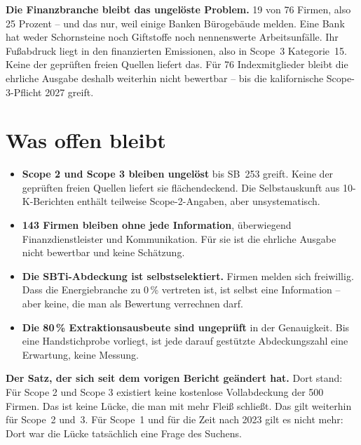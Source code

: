\documentclass[11pt,a4paper]{article}
\newcommand{\befund}[1]{%
  \par\vspace{2pt}\noindent\colorbox{softgrey}{%
  \begin{minipage}{\dimexpr\linewidth-2\fboxsep}\small\vspace{3pt}#1\vspace{3pt}\end{minipage}}\par\vspace{4pt}}
\begin{document}
\befund{\textbf{Die Finanzbranche bleibt das ungelöste Problem.} 19 von 76 Firmen, also 25 Prozent -- und das nur, weil einige Banken Bürogebäude melden. Eine Bank hat weder Schornsteine noch Giftstoffe noch nennenswerte Arbeitsunfälle. Ihr Fußabdruck liegt in den finanzierten Emissionen, also in Scope~3 Kategorie~15. Keine der geprüften freien Quellen liefert das. Für 76 Indexmitglieder bleibt die ehrliche Ausgabe deshalb weiterhin \glqq nicht bewertbar\grqq{} -- bis die kalifornische Scope-3-Pflicht 2027 greift.}

\section{Was offen bleibt}

\begin{itemize}
\item \textbf{Scope 2 und Scope 3 bleiben ungelöst} bis SB~253 greift. Keine der geprüften freien Quellen liefert sie flächendeckend. Die Selbstauskunft aus 10-K-Berichten enthält teilweise Scope-2-Angaben, aber unsystematisch.
\item \textbf{143 Firmen bleiben ohne jede Information}, überwiegend Finanzdienstleister und Kommunikation. Für sie ist die ehrliche Ausgabe \glqq nicht bewertbar\grqq{} und keine Schätzung.
\item \textbf{Die SBTi-Abdeckung ist selbstselektiert.} Firmen melden sich freiwillig. Dass die Energiebranche zu 0\,\% vertreten ist, ist selbst eine Information -- aber keine, die man als Bewertung verrechnen darf.
\item \textbf{Die 80\,\% Extraktionsausbeute sind ungeprüft} in der Genauigkeit. Bis eine Handstichprobe vorliegt, ist jede darauf gestützte Abdeckungszahl eine Erwartung, keine Messung.
\end{itemize}

\vfill
\befund{\textbf{Der Satz, der sich seit dem vorigen Bericht geändert hat.} Dort stand: \glqq Für Scope 2 und Scope 3 existiert keine kostenlose Vollabdeckung der 500 Firmen. Das ist keine Lücke, die man mit mehr Fleiß schließt.\grqq{} Das gilt weiterhin für Scope~2 und~3. Für Scope~1 und für die Zeit nach 2023 gilt es nicht mehr: Dort war die Lücke tatsächlich eine Frage des Suchens.}
\end{document}

